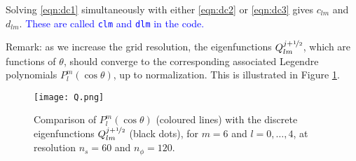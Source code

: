 \documentclass[11pt]{article}
\newcommand{\ns}{n_s}
\newcommand{\nph}{n_\phi}
\newcommand{\half}{\nicefrac{1}{2}}
\begin{document}
Solving \eqref{eqn:dc1} simultaneously with either \eqref{eqn:dc2} or \eqref{eqn:dc3} gives $c_{lm}$ and $d_{lm}$. \textcolor{blue}{These are called \texttt{clm} and \texttt{dlm} in the code.}

Remark: as we increase the grid resolution, the eigenfunctions $Q_{lm}^{j+\half}$, which are functions of $\theta$, should converge to the corresponding associated Legendre polynomials $P_l^m(\cos\theta)$, up to normalization. This is illustrated in Figure \ref{fig:Q}.

\begin{figure}
\centering
\texttt{[image: Q.png]}
\caption{Comparison of $P_l^m(\cos\theta)$ (coloured lines) with the discrete eigenfunctions $Q_{lm}^{j+\half}$ (black dots), for $m=6$ and $l=0,\ldots,4$, at resolution $\ns=60$ and $\nph=120$. \label{fig:Q}}
\end{figure}



\end{document}
